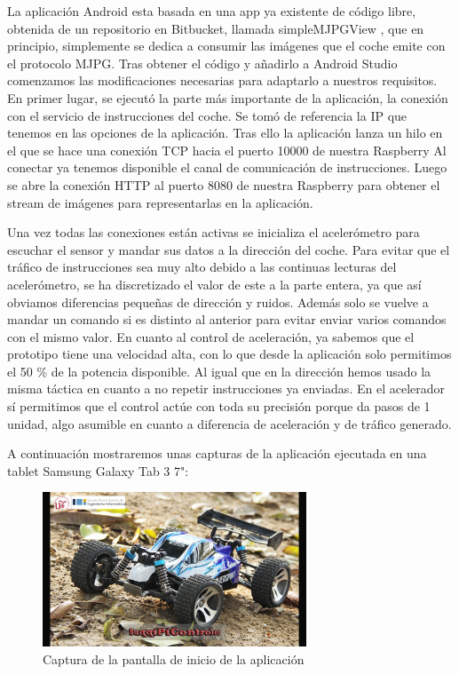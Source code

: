 \documentclass{pclass}
\begin{document}
\begin{itemize}
\begin{itemize}
	La aplicación Android esta basada en una app ya existente de código libre, obtenida de un repositorio en Bitbucket, llamada simpleMJPGView \cite{simpleMJPG}, que en principio, simplemente se dedica a consumir las imágenes que el coche emite con el protocolo MJPG. Tras obtener el código y añadirlo a Android Studio comenzamos las modificaciones necesarias para adaptarlo a nuestros requisitos. En primer lugar, se ejecutó la parte más importante de la aplicación, la conexión con el servicio de instrucciones del coche. Se tomó de referencia la IP que tenemos en las opciones de la aplicación. Tras ello la aplicación lanza un hilo en el que se hace una conexión TCP hacia el puerto 10000 de nuestra Raspberry Al conectar ya tenemos disponible el canal de comunicación de instrucciones. Luego se abre la conexión HTTP al puerto 8080 de nuestra Raspberry para obtener el stream de imágenes para representarlas en la aplicación. 
	
	Una vez todas las conexiones están activas se inicializa el acelerómetro para escuchar el sensor y mandar sus datos a la dirección del coche. Para evitar que el tráfico de instrucciones sea muy alto debido a las continuas lecturas del acelerómetro, se ha discretizado el valor de este a la parte entera, ya que así obviamos diferencias pequeñas de dirección y ruidos. Además solo se vuelve a mandar un comando si es distinto al anterior para evitar enviar varios comandos con el mismo valor. En cuanto al control de aceleración, ya sabemos que el prototipo tiene una velocidad alta, con lo que desde la aplicación solo permitimos el 50 \%  de la potencia disponible. Al igual que en la dirección hemos usado la misma táctica en cuanto a no repetir instrucciones ya enviadas. En el acelerador sí permitimos que el control actúe con toda su precisión porque da pasos de 1 unidad, algo asumible en cuanto a diferencia de aceleración y de tráfico generado.
	
	A continuación mostraremos unas capturas de la aplicación ejecutada en una tablet Samsung Galaxy Tab 3 7":
	
	\begin{figure}[H]
		\centering
		\includegraphics[width=0.7\textwidth]{img/inicio}
		\caption{Captura de la pantalla de inicio de la aplicación}
		\label{fig:capturaInicio}
	\end{figure}


\end{itemize}
\end{itemize}
\end{document}
